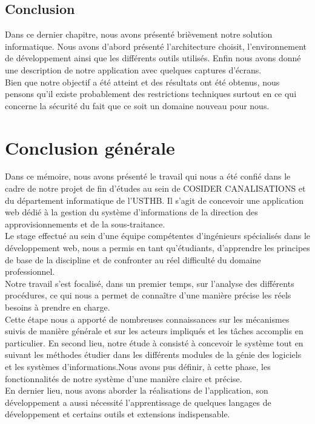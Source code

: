 \documentclass{report}
\begin{document}
\section{Conclusion}
Dans ce dernier chapitre, nous avons présenté brièvement notre solution informatique. Nous avons d’abord présenté l’architecture choisit, l’environnement de développement ainsi que les différents outils utilisés.
Enfin nous avons donné une description de notre application avec quelques captures d'écrans.\\
Bien que notre objectif a été atteint et des résultats ont été obtenus, nous pensons qu’il existe probablement des restrictions techniques surtout en ce qui concerne la sécurité du fait que ce soit un domaine nouveau pour nous.



\chapter*{Conclusion générale}
Dans ce mémoire, nous avons présenté le travail qui nous a été confié dans le cadre de
notre projet de fin d’études au sein de COSIDER CANALISATIONS et du département informatique de l'USTHB. Il s’agit de concevoir une application web dédié à la gestion du système d'informations de la direction des approvisionnements et de la sous-traitance.\\
Le stage effectué au sein d'une équipe compétentes d'ingénieurs spécialisés dans le développement web, nous a permis en tant qu’étudiants, d’apprendre les principes de base de la discipline et de confronter au réel difficulté du domaine professionnel.\\
Notre travail s’est focalisé, dans un premier temps, sur l'analyse des différents procédures,
ce qui nous a permet de connaître d'une manière précise les réels besoins à prendre en charge.\\
Cette étape nous a apporté de nombreuses connaissances sur les mécanismes suivis de manière générale et sur les acteurs impliqués et les tâches accomplis en particulier.
En second lieu, notre étude à consisté à concevoir le système tout en suivant les méthodes étudier dans les différents modules de la génie des logiciels et les systèmes d'informations.Nous avons pus définir, à cette phase, les fonctionnalités de notre système d'une manière claire et précise.\\
En dernier lieu, nous avons aborder la réalisations de l'application, son développement a aussi nécessité l’apprentissage de quelques langages de développement et certains outils et extensions indispensable.\\
\end{document}

